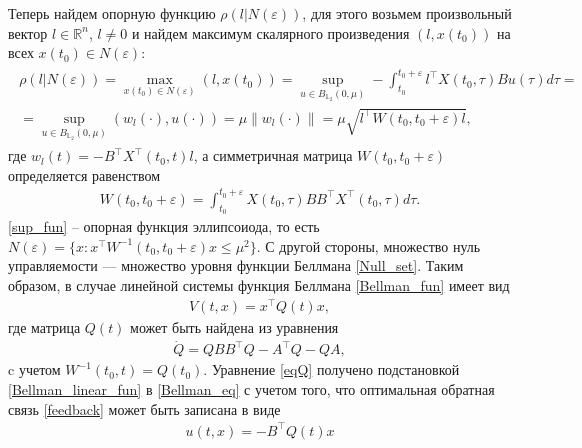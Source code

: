 \documentclass[12pt,a4paper,twoside]{article}  %
\begin{document}
		Теперь найдем опорную функцию $ \rho(l|N(\varepsilon))$, для этого возьмем произвольный вектор  $l \in \mathbb{R}^n$, $ l \neq 0 $ и найдем максимум скалярного произведения $ (l,x(t_0)) $ на всех $x(t_0) \in N(\varepsilon)$:
		\begin{gather}\label{sup_fun}
			\begin{gathered}
				\rho(l|N(\varepsilon)) = \max\limits_{x(t_0) \in N(\varepsilon)} (l,x(t_0))  = \sup\limits_{u \in B_{\mathbb{L}_2}(0,\mu)} -\int_{t_0}^{t_0+\varepsilon} l^{\top}X(t_0,\tau) B u(\tau) d\tau =\\=  \sup\limits_{u \in B_{\mathbb{L}_2}(0,\mu)} (w_l(\cdot),u(\cdot)) = \mu \| w_l(\cdot)\| = \mu \sqrt{l^{\top} W(t_0,t_0+\varepsilon) l},
			\end{gathered}
		\end{gather}
		где $ w_l(t) = -B^{\top}X^{\top}(t_0,t) l$, а симметричная матрица $ W(t_0,t_0+\varepsilon) $ определяется равенством
		\begin{gather}\label{W}
			W(t_0,t_0+\varepsilon) = \int_{t_0}^{t_0+\varepsilon} X(t_0,\tau) B B^{\top} X^{\top} (t_0,\tau) d\tau.
		\end{gather}
		\eqref{sup_fun} -- опорная функция эллипсоиода, то есть $ N(\varepsilon) = \{x: x^{\top} W^{-1}(t_0,t_0+\varepsilon)x \leqslant \mu^2\}$. С другой стороны, множество нуль управляемости --- множество уровня функции Беллмана \eqref{Null_set}. Таким образом, в случае линейной системы функция Беллмана \eqref{Bellman_fun} имеет вид
		\begin{gather}\label{Bellman_linear_fun}
			V(t,x) = x^{\top} Q(t) x,
		\end{gather}
		где матрица  $ Q(t) $ может быть найдена из уравнения 
		\begin{gather}\label{eqQ}
			\dot{Q}  = Q B B^{\top} Q - A^{\top}Q - Q A,
		\end{gather}
		c учетом $ W^{-1}(t_0,t) = Q(t_0) $.
		Уравнение \eqref{eqQ} получено подстановкой \eqref{Bellman_linear_fun} в \eqref{Bellman_eq} с учетом того, что оптимальная обратная связь \eqref{feedback} может быть записана в виде
		\begin{gather}\label{linear_feedback}
			u(t,x) = -B^{\top} Q(t) x
		\end{gather}
		
\end{document}

